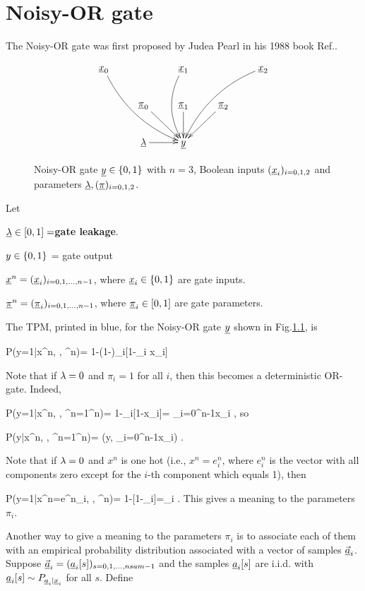 \chapter{Noisy-OR gate}
The Noisy-OR gate was first
proposed by Judea Pearl in his 1988 book
 Ref.\cite{pearl-1988book}.
\begin{figure}[h!]
$$\xymatrix{
\rvx_0\ar@/_1pc/[ddrr]
&&\rvx_1\ar@/_1pc/[dd]
&&\rvx_2\ar@/_1pc/[ddll]
\\
&\ul{\pi}_0\ar[dr]
&\ul{\pi}_1\ar[d]
&\ul{\pi}_2\ar[dl]
\\
&\ul{\lam}\ar[r]
&\rvy
}$$
\caption{Noisy-OR gate ${\underline{y}}\in\{0,1\}$
with $n=3$, Boolean inputs $({\underline{x}}_i)_{i=0,1,2}$
and parameters 
$\underline{\lambda}, (\underline{\pi})_{i=0,1,2}$.
}
\label{fig-noisy-or-1}
\end{figure}

Let

$\underline{\lambda}\in [0, 1]=${\bf gate leakage}.

$y\in \{0,1\}$ = gate  output

${\underline{x}}^n=({\underline{x}}_i)_{i=0,1, \ldots, n-1}$, where
${\underline{x}}_i\in\{0,1\}$ are
 gate inputs.

$\underline{\pi}^n=(\underline{\pi}_i)_{i=0,1, \ldots, n-1}$, where
$\underline{\pi}_i\in[0,1]$ are
 gate parameters.


The TPM, printed in blue,
 for the Noisy-OR gate ${\underline{y}}$ 
shown in Fig.\ref{fig-noisy-or-1}, is

\beq\color{blue}
P(y=1|x^n, \lam, \pi^n)=
1-(1-\lam)\prod_i[1-\pi_i x_i]
\label{eq-noisy-or-tmp-1}
\eeq

Note
that if $\lambda=0$ and $\pi_i=1$ for all $i$,
then this becomes 
a deterministic OR-gate. Indeed,

\beq
P(y=1|x^n, , \pi^n=1^n)= 1-\prod_i[1-x_i]=
\V_{i=0}^{n-1}x_i
\;,
\eeq
so 

\beq
P(y|x^n, , \pi^n=1^n)=
\delta(y, \V_{i=0}^{n-1}x_i)
\;.
\eeq


Note that if $\lambda=0$ and $x^n$ is one hot (i.e., 
$x^n=e^n_i$, where $e^n_i$
is the vector with all components 
zero except for the $i$-th
component which equals 1), then

\beq
P(y=1|x^n=e^n_i, , \pi^n)=
1-[1-\pi_i]=\pi_i
\;.
\eeq
This gives a meaning to the
parameters $\pi_i$.

Another way to
give a meaning to the 
parameters $\pi_i$
is to associate each of 
them with an
empirical probability 
distribution associated 
with a vector of samples
$\vec{{\underline{a}}}_i$.
Suppose
$\vec{{\underline{a}}}_i=({\underline{a}}_i[s])_
{s=0, 1, \ldots, nsam-1}$ 
and  the samples ${\underline{a}}_i[s]$
 are i.i.d. with
${\underline{a}}_i[s]\sim P_{{\underline{a}}_i|{\underline{x}}_i}$
for all $s$.
Define


